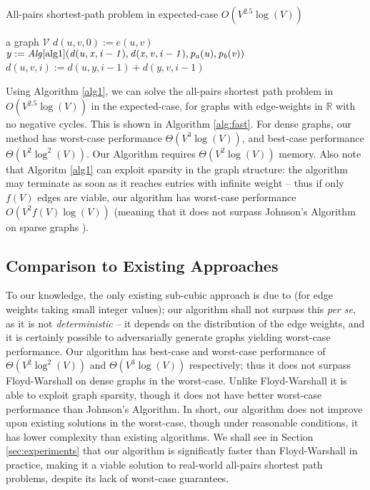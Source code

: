 \documentclass[a4paper,10pt]{article}
\begin{document}
\begin{algorithm}
 \caption{All-pairs shortest-path problem in expected-case $O(V^{2.5}\log(V))$}
 \label{alg:fast}
\begin{algorithmic}[1]
 \REQUIRE a graph $\mathcal V$
     \STATE $d(u,v,0) := e(u,v)$
   \ENDFOR
 \ENDFOR
   \ENDFOR\ 
       \STATE $y := \mathit{Alg\ref{alg1}(d(u,x,i-1), d(x,v,i-1), p_a(u), p_b(v))}$ 
       \STATE $d(u,v,i) := d(u,y,i-1) + d(y,v,i-1)$
     \ENDFOR
   \ENDFOR\ 
 \ENDFOR\ 
\end{algorithmic}
\end{algorithm}


Using Algorithm \ref{alg1}, we can solve the all-pairs shortest path problem in $O(V^{2.5}\log(V))$ in the expected-case, for graphs with edge-weights in $\mathbb R$ with no negative cycles. This is shown in Algorithm \ref{alg:fast}. For dense graphs, our method has worst-case performance $\Theta(V^3\log(V))$, and best-case performance $\Theta(V^2\log^2(V))$. Our Algorithm requires $\Theta(V^2\log(V))$ memory. Also note that Algoritm \ref{alg1} can exploit sparsity in the graph structure: the algorithm may terminate as soon as it reaches entries with infinite weight -- thus if only $f(V)$ edges are viable, our algorithm has worst-case performance $O(V^2f(V)\log(V))$ (meaning that it does not surpass Johnson's Algorithm on sparse graphs \cite{johnson}).

\subsection{Comparison to Existing Approaches}

To our knowledge, the only existing sub-cubic approach is due to \cite{allpsp} (for edge weights taking small integer values); our algorithm shall not surpass this \emph{per se}, as it is not \emph{deterministic} -- it depends on the distribution of the edge weights, and it is certainly possible to adversarially generate graphs yielding worst-case performance. Our algorithm has best-case and worst-case performance of $\Theta(V^2\log^2(V))$ and $\Theta(V^3\log(V))$ respectively; thus it does not surpass Floyd-Warshall on dense graphs in the worst-case. Unlike Floyd-Warshall it is able to exploit graph sparsity, though it does not have better worst-case performance than Johnson's Algorithm. In short, our algorithm does not improve upon existing solutions in the worst-case, though under reasonable conditions, it has lower complexity than existing algorithms. We shall see in Section \ref{sec:experiments} that our algorithm is significatly faster than Floyd-Warshall in practice, making it a viable solution to real-world all-pairs shortest path problems, despite its lack of worst-case guarantees.
\end{document}
